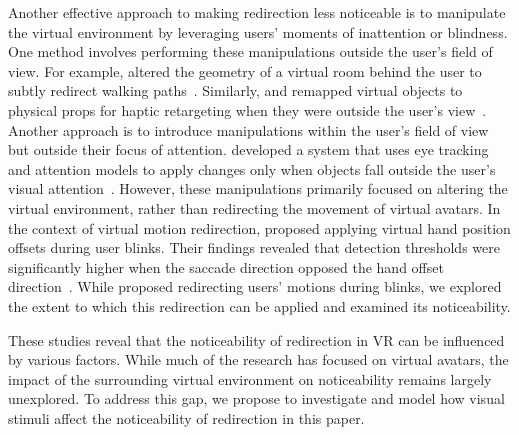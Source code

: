 Another effective approach to making redirection less noticeable is to manipulate the virtual environment by leveraging users' moments of inattention or blindness.
One method involves performing these manipulations outside the user’s field of view. 
For example, \citeauthor{suma2010exploiting} altered the geometry of a virtual room behind the user to subtly redirect walking paths~\cite{suma2010exploiting}. 
Similarly, \citeauthor{lohse2019leveraging} and \citeauthor{patras2022body} remapped virtual objects to physical props for haptic retargeting when they were outside the user’s view~\cite{lohse2019leveraging, patras2022body}.
Another approach is to introduce manipulations within the user’s field of view but outside their focus of attention. 
\citeauthor{marwecki2019mise} developed a system that uses eye tracking and attention models to apply changes only when objects fall outside the user’s visual attention~\cite{marwecki2019mise}.
However, these manipulations primarily focused on altering the virtual environment, rather than redirecting the movement of virtual avatars. 
In the context of virtual motion redirection, \citeauthor{zenner2023detectability} proposed applying virtual hand position offsets during user blinks. 
Their findings revealed that detection thresholds were significantly higher when the saccade direction opposed the hand offset direction~\cite{zenner2023detectability, zenner2021blink}.
While \citeauthor{zenner2023detectability} proposed redirecting users' motions during blinks, we explored the extent to which this redirection can be applied and examined its noticeability.

These studies reveal that the noticeability of redirection in VR can be influenced by various factors. 
While much of the research has focused on virtual avatars, the impact of the surrounding virtual environment on noticeability remains largely unexplored. 
To address this gap, we propose to investigate and model how visual stimuli affect the noticeability of redirection in this paper.


